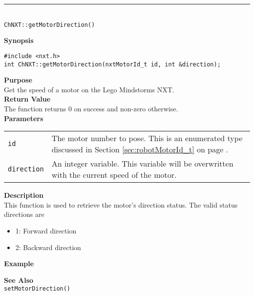 \noindent
\vspace{5pt}
\rule{4.5in}{0.015in}\\
\noindent
{\LARGE \texttt{ChNXT::getMotorDirection()}}\\
{}

\noindent
{\bf Synopsis}
\begin{lstlisting}
#include <nxt.h>
int ChNXT::getMotorDirection(nxtMotorId_t id, int &direction);
\end{lstlisting}

\noindent
{\bf Purpose}\\
Get the speed of a motor on the Lego Mindstorms NXT.\\

\noindent
{\bf Return Value}\\
The function returns 0 on success and non-zero otherwise.\\

\noindent
{\bf Parameters}
\vspace{-0.1in}
\begin{description}
\item               
\begin{tabular}{p{10 mm}p{145 mm}}
\texttt{id} & The motor number to pose. This is an enumerated type 
discussed in Section \ref{sec:robotMotorId_t} on page
\pageref{sec:robotMotorId_t}.\\
\texttt{direction} & An integer variable. This variable will be overwritten
with the current speed of the motor.
\end{tabular}
\end{description}

\noindent
{\bf Description}\\
This function is used to retrieve the motor's direction status. The valid
status directions are
\begin{itemize}
\item 1: Forward direction
\item 2: Backward direction
\end{itemize}

\noindent
{\bf Example}
\noindent

\noindent
{\bf See Also}\\
\texttt{setMotorDirection()}

